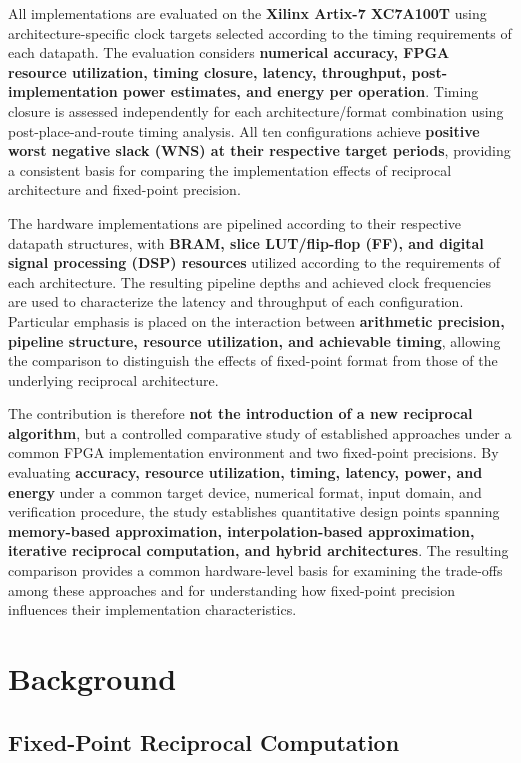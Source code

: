 \documentclass[manuscript,screen,review]{acmart}
\begin{document}
All implementations are evaluated on the \textbf{Xilinx Artix-7 XC7A100T} using architecture-specific clock targets selected according to the timing requirements of each datapath. The evaluation considers \textbf{numerical accuracy, FPGA resource utilization, timing closure, latency, throughput, post-implementation power estimates, and energy per operation}. Timing closure is assessed independently for each architecture/format combination using post-place-and-route timing analysis. All ten configurations achieve \textbf{positive worst negative slack (WNS) at their respective target periods}, providing a consistent basis for comparing the implementation effects of reciprocal architecture and fixed-point precision.

The hardware implementations are pipelined according to their respective datapath structures, with \textbf{BRAM, slice LUT/flip-flop (FF), and digital signal processing (DSP) resources} utilized according to the requirements of each architecture. The resulting pipeline depths and achieved clock frequencies are used to characterize the latency and throughput of each configuration. Particular emphasis is placed on the interaction between \textbf{arithmetic precision, pipeline structure, resource utilization, and achievable timing}, allowing the comparison to distinguish the effects of fixed-point format from those of the underlying reciprocal architecture.

The contribution is therefore \textbf{not the introduction of a new reciprocal algorithm}, but a controlled comparative study of established approaches under a common FPGA implementation environment and two fixed-point precisions. By evaluating \textbf{accuracy, resource utilization, timing, latency, power, and energy} under a common target device, numerical format, input domain, and verification procedure, the study establishes quantitative design points spanning \textbf{memory-based approximation, interpolation-based approximation, iterative reciprocal computation, and hybrid architectures}. The resulting comparison provides a common hardware-level basis for examining the trade-offs among these approaches and for understanding how fixed-point precision influences their implementation characteristics.

\section{Background}
\label{sec:background}

\subsection{Fixed-Point Reciprocal Computation}
\label{sec:fixedpoint}
\end{document}
